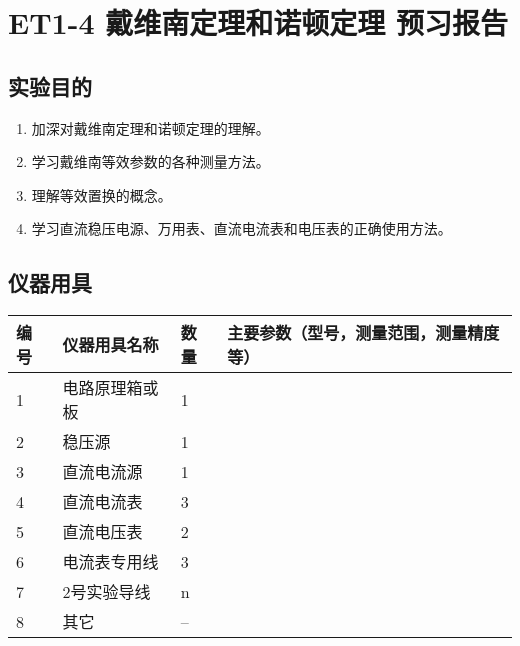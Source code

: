 \documentclass[dvipsnames, svgnames,a4paper,11pt]{article}
\begin{document}
	
	
	\clearpage
	\tableofcontents
	\clearpage
	
	
	
	
	\setcounter{section}{0}
	\section{ET1-4 戴维南定理和诺顿定理 \quad\heiti 预习报告}
	
	\subsection{实验目的}
	\begin{enumerate}
		\item 加深对戴维南定理和诺顿定理的理解。
		\item 学习戴维南等效参数的各种测量方法。
		\item 理解等效置换的概念。
		\item 学习直流稳压电源、万用表、直流电流表和电压表的正确使用方法。
		
	\end{enumerate}
	
	\subsection{仪器用具}
	\begin{table}[htbp]
		\centering
		\renewcommand\arraystretch{1.6}
		\begin{tabular}{p{}|p{}|p{}|p{}}
			\hline
			编号& 仪器用具名称 & 数量 &  主要参数（型号，测量范围，测量精度等） \\
			\hline
			1& 电路原理箱或板 & 1 &  \\
			\hline
			2& 稳压源 & 1 &  \\
			\hline
			3& 直流电流源 & 1 &  \\
			\hline
			4& 直流电流表 & 3 &  \\
			\hline
			5& 直流电压表 & 2 &  \\
			\hline
			6& 电流表专用线 & 3 &  \\
			\hline
			7& 2号实验导线 & n &  \\
			\hline
			8& 其它 & -- &  \\
			\hline
		\end{tabular}
	\end{table}
	
\end{document}
